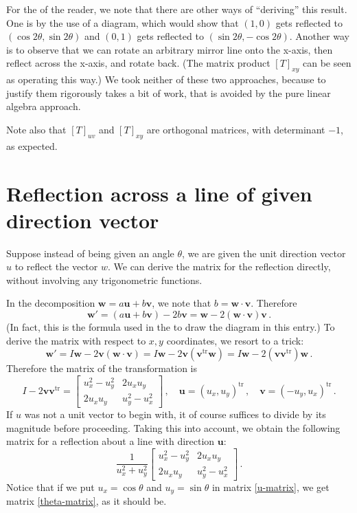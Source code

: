 \documentclass[12pt]{article}
\providecommand{\transpose}[1]{#1^{\textrm{tr}}}
\newcommand{\vu}{\mathbf{u}}
\newcommand{\vv}{\mathbf{v}}
\newcommand{\vw}{\mathbf{w}}
\begin{document}
For the  of the reader, we note that there are other ways of ``deriving'' this result.
One is by the use of a diagram, which would show that $(1,0)$ gets reflected
to $(\cos 2\theta, \sin 2\theta)$ and $(0,1)$ gets reflected to $(\sin 2\theta, -\cos 2\theta)$.
Another way is to observe that we can rotate an arbitrary mirror line
onto the x-axis, then reflect across the x-axis, and rotate back.
(The matrix product $[T]_{xy}$ can be seen as operating this way.)
We took neither of these two approaches, because to justify them rigorously takes a bit of work,
that is avoided by the pure linear algebra approach.

Note also that $[T]_{uv}$ and $[T]_{xy}$ are orthogonal matrices,
with determinant $-1$, as expected.

\section*{Reflection across a line of given direction vector}
Suppose instead of being given an angle $\theta$,
we are given the unit direction vector $u$ to reflect the vector $w$.
We can derive the matrix for the reflection directly, without involving any trigonometric functions.

In the decomposition $\vw = a \vu + b\vv$,
we note that $b = \vw \cdot \vv$.  Therefore 
\[
\vw' = (a\vu + b\vv) - 2b\vv = \vw - 2(\vw \cdot \vv) \vv\,.
\] 
(In fact, this is the formula used in the  to draw the diagram in this entry.)
To derive the matrix with respect to $x,y$ coordinates, we resort to a trick:
\[
\vw' = I\vw - 2\vv (\vw \cdot \vv) = I\vw - 2\vv (\transpose{\vv} \vw) = I\vw - 2(\vv \transpose{\vv}) \vw\,.
\]
Therefore the matrix of the transformation is
\[
I - 2\vv \transpose{\vv}  = \begin{bmatrix}
u_x^2 - u_y^2 & 2u_x u_y \\
2u_x u_y & u_y^2 - u_x^2
\end{bmatrix}\,, \quad \vu = \transpose{(u_x, u_y)}\,, \quad \vv = \transpose{(-u_y, u_x)}\,.
\]
If $u$ was not a unit vector to begin with, it of course suffices to divide by its magnitude before proceeding. Taking this into account, we obtain the following matrix for a reflection
about a line with direction $\vu$:
\begin{equation}
\label{u-matrix}
\frac{1}{u_x^2 + u_y^2} 
\begin{bmatrix}
u_x^2 - u_y^2 & 2u_x u_y \\
2u_x u_y & u_y^2 - u_x^2
\end{bmatrix}\,.
\end{equation}
Notice that if we put $u_x = \cos \theta$ and $u_y = \sin \theta$ in matrix \eqref{u-matrix},
we get matrix \eqref{theta-matrix}, as it should be.
\end{document}
